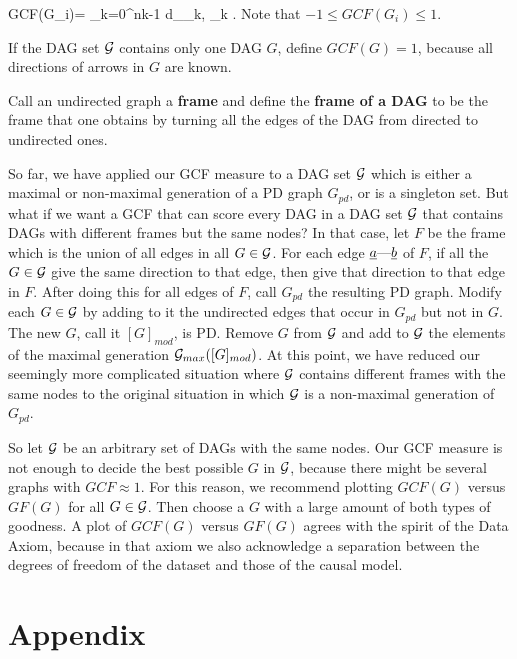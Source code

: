 \documentclass[12pt]{article}
\newcommand{\link }[0]{\text{---}}
\begin{document}
\beq
GCF(G_i)= 
\frac{
\sum_{k=0}^{nk-1}
\rho_{G_i}(\rva_k\link \rvb_k)
d_{\rva_k, \rvb_k}
}
{
\sum_{k=0}^{nk-1}
d_{\rva_k, \rvb_k}
}
\;.
\label{eq-rel-gfc}
\eeq
Note that
$-1\leq GCF(G_i)  \leq 1$.

If the DAG set ${\cal G}$ 
contains only one DAG $G$,
define $GCF(G)=1$, because all
directions of 
arrows in $G$ are known.

Call an undirected graph a {\bf frame}
and define the
{\bf frame of a DAG}
to be the frame that one obtains
by turning
all the edges of the DAG from directed 
to undirected ones.

So far, we 
have applied our GCF measure
 to a DAG set ${\cal G}$
which is
either a maximal or 
non-maximal generation
of  a PD graph $G_{pd}$,
or is a singleton set.
But what if we want a GCF
that can score every DAG
in a  DAG set
${\cal G}$ that contains
DAGs with different frames
but the same nodes?
In that case, 
let $F$
be the frame
which 
is the union of 
all edges in all $G\in {\cal G}$.
For each edge $\rva\link \rvb$ of $F$,
if all the $G\in {\cal G}$
give the same direction
to that edge, then give that direction
to that edge in $F$.
After doing this for
all edges of $F$,
call $G_{pd} $ the resulting 
PD graph.
Modify each $G\in {\cal G}$
by adding to it the undirected edges
that occur in $G_{pd}$
but not in $G$.
The new $G$, call it $[G]_{mod}$,
is PD. Remove $G$ from ${\cal G}$
and add to ${\cal G}$
the elements of
the maximal generation ${\cal G}_{max}([G]_{mod})$.
At this point,
we have reduced our
seemingly more 
complicated situation
where ${\cal G}$ contains
different frames with the same nodes
to the original situation
in which ${\cal G}$
is a non-maximal 
generation of $G_{pd}$.



So let ${\cal G}$
be an arbitrary set of
DAGs with the same nodes.
Our GCF  measure
is not enough to
decide the best 
possible $G$ in ${\cal G}$,
because there might 
be several graphs with 
$GCF\approx 1$.
For this reason,
we recommend
plotting $GCF(G)$ 
versus $GF(G)$
for all $G\in{\cal G}$.
Then  choose a $G$ with a
large amount
of both types of goodness.
A plot of 
$GCF(G)$
versus $GF(G)$
agrees with the spirit of
the Data 
Axiom,
because in that axiom 
we also acknowledge a separation between the
degrees of freedom of the
dataset  and 
those of the causal model.

\appendix

\section{Appendix}
\end{document}
